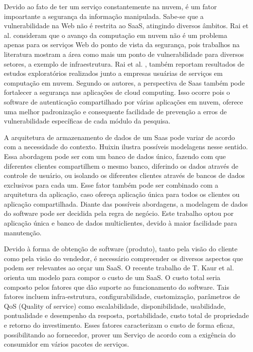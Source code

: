 Devido ao fato de ter um serviço constantemente na nuvem, é um fator impoartante a segurança da informação manipulada. Sabe-se que a vulnerabilidade na Web não é restrita ao SaaS, atingindo diversos âmbitos. Rai et al. \cite{journals/corr/RaiSM13} consideram que o avanço da computação em nuvem não é um problema apenas para os serviços Web do ponto de vista da segurança, pois trabalhos na literatura mostram a área como mais um ponto de vulnerabilidade para diversos setores, a exemplo de infraestrutura. Rai et al. \cite{journals/corr/RaiSM13}, também reportam resultados de estudos exploratórios realizados junto a empresas usuárias de serviços em computação em nuvem. Segundo os autores, a perspectiva de Saas também pode fortalecer a segurança nas aplicações de cloud computing. Isso ocorre pois o software de autenticação compartilhado por várias aplicações em nuvem, oferece uma melhor padronização e consequente facilidade de prevenção a erros de vulnerabilidade específicas de cada módulo da pesquisa. %


A arquitetura de armazenamento de dados de um Saas pode variar de acordo com a necessidade do contexto. Huixin \cite{7586486} ilustra possíveis modelagens nesse sentido. Essa abordagem pode ser com um banco de dados único, fazendo com que diferentes clientes compartilhem o mesmo banco, diferindo os dados através de controle de usuário, ou isolando os diferentes clientes através de bancos de dados exclusivos para cada um. Esse fator também pode ser combinado com a arquitetura da aplicação, caso ofereça aplicação única para todos os clientes ou aplicação compartilhada. Diante das possíveis abordagens, a modelagem de dados do software pode ser decidida pela regra de negócio. Este trabalho optou por aplicação única e banco de dados multiclientes, devido à maior facilidade para manutenção.

Devido à forma de obtenção de software (produto), tanto pela visão do cliente como pela visão do vendedor, é necessário compreender os diversos aspectos que podem ser relevantes ao orçar um SaaS. O recente trabalho de T. Kaur et al. \citep{6949281} orienta um modelo para compor o custo de um SaaS. O custo total seria composto pelos fatores que dão suporte ao funcionamento do software. Tais fatores incluem infra-estrutura, configurabilidade, customização, parâmetros de QoS (Quality of service) como escalabilidade, disponibilidade, usabilidade, pontualidade e desempenho da resposta, portabilidade, custo total de propriedade e retorno do investimento. Esses fatores caracterizam o custo de forma eficaz, possibilitando ao fornecedor, prover um Serviço de acordo com a exigência do consumidor em vários pacotes de serviços.


